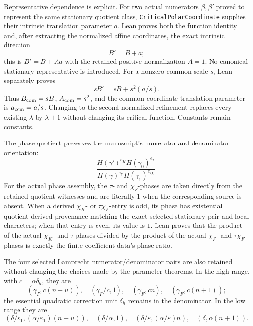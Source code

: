 \begin{definition}
Representative dependence is explicit.  For two actual numerators
\(\beta,\beta'\) proved to represent the same stationary quotient class,
\texttt{CriticalPolarCoordinate} supplies their intrinsic translation
parameter \(a\).  Lean proves both the function identity and, after extracting
the normalized affine coordinates, the exact intrinsic direction
\[
 B'=B+a;
\]
this is \(B'=B+Aa\) with the retained positive normalization \(A=1\).
No canonical stationary representative is introduced.  For a nonzero common
scale \(s\), Lean separately proves
\[
 sB'=sB+s^2(a/s).
\]
Thus \(B_{\rm com}=sB\), \(A_{\rm com}=s^2\), and the common-coordinate
translation parameter is \(a_{\rm com}=a/s\).  Changing to the second
normalized refinement replaces every existing \(\lambda\) by \(\lambda+1\)
without changing its critical function.  Constants remain constants.

The phase quotient preserves the manuscript's numerator and denominator
orientation:
\[
 \frac{H(\gamma')^{e_K}H(\gamma _0)^{e_\tau}}
      {H(\gamma)^{e_\chi}H(\gamma _1)^{e_{\tau\chi}}}.
\]
For the actual phase assembly, the \(\tau\)- and \(\chi_F\)-phases are taken
directly from the retained quotient witnesses and are literally \(1\) when
the corresponding source is absent.  When a derived \(\chi_K\)- or
\(\tau\chi_F\)-entry is odd, its phase has existential quotient-derived
provenance matching the exact selected stationary pair and local characters;
when that entry is even, its value is \(1\).  Lean proves that the product of
the actual \(\chi_K\)- and \(\tau\)-phases divided by the product of the actual
\(\chi_F\)- and \(\tau\chi_F\)-phases is exactly the finite coefficient data's
phase ratio.

The four selected Lamprecht numerator/denominator pairs are also retained
without changing the choices made by the parameter theorems.  In the high
range, with \(c=\alpha\delta_h\), they are
\[
 (\gamma_F,c(n-u)),\quad(\gamma_F/c,1),\quad
 (\gamma_F,cn),\quad(\gamma_F,c(n+1));
\]
the essential quadratic correction unit \(\delta_h\) remains in the
denominator.  In the low range they are
\[
 (\delta/\varepsilon _1,(\alpha/\varepsilon _1)(n-u)),\quad
 (\delta/\alpha,1),\quad
 (\delta/\varepsilon,(\alpha/\varepsilon)n),\quad
 (\delta,\alpha(n+1)).
\]


\end{definition}
